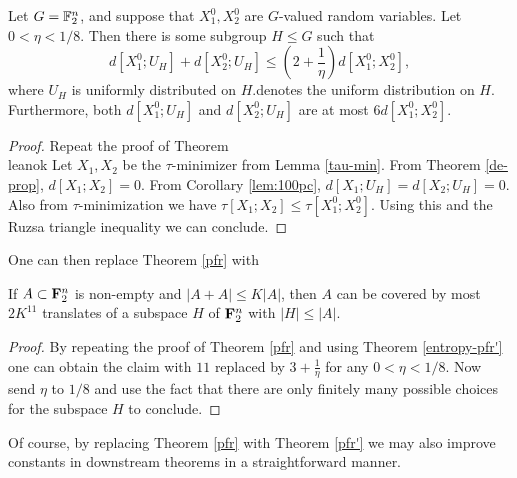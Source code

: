 \begin{theorem}\label{entropy-pfr'}\leanok
  Let $G = \mathbb{F}_2^n$, and suppose that $X^0_1, X^0_2$ are $G$-valued random variables. Let $0 < \eta < 1/8$.
  Then there is some subgroup $H \leq G$ such that
  \[
    d[X^0_1;U_H] + d[X^0_2;U_H] \le (2+\frac{1}{\eta}) d[X^0_1;X^0_2],
  \]
  where $U_H$ is uniformly distributed on $H$.denotes the uniform distribution on $H$.
  Furthermore, both $d[X^0_1;U_H]$ and $d[X^0_2;U_H]$ are at most $6 d[X^0_1;X^0_2]$.
\end{theorem}

\begin{proof}  Repeat the proof of Theorem \\leanok  Let $X_1, X_2$ be the $\tau$-minimizer from Lemma \ref{tau-min}.  From Theorem \ref{de-prop}, $d[X_1;X_2]=0$.  From Corollary \ref{lem:100pc}, $d[X_1;U_H] = d[X_2; U_H] = 0$.  Also from $\tau$-minimization we have $\tau[X_1;X_2] \leq \tau[X^0_1;X^0_2]$.  Using this and the Ruzsa triangle inequality we can conclude.
\end{proof}

One can then replace Theorem \ref{pfr} with

\begin{theorem}\label{pfr'}\leanok
  If $A \subset {\bf F}_2^n$ is non-empty and $|A+A| \leq K|A|$, then $A$ can be covered by most $2K^{11}$ translates of a subspace $H$ of ${\bf F}_2^n$ with $|H| \leq |A|$.
\end{theorem}

\begin{proof} By repeating the proof of Theorem \ref{pfr} and using Theorem \ref{entropy-pfr'} one can obtain the claim with $11$ replaced by $3 +\frac{1}{\eta}$ for any $0 < \eta < 1/8$.  Now send $\eta$ to $1/8$ and use the fact that there are only finitely many possible choices for the subspace $H$ to conclude.
\end{proof}

Of course, by replacing Theorem \ref{pfr} with Theorem \ref{pfr'} we may also improve constants in downstream theorems in a straightforward manner.
